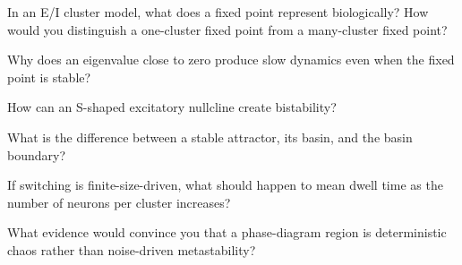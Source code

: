 \begin{conceptquestions}
  \item In an E/I cluster model, what does a fixed point represent biologically? How would you distinguish a one-cluster fixed point from a many-cluster fixed point?
  \item Why does an eigenvalue close to zero produce slow dynamics even when the fixed point is stable?
  \item How can an S-shaped excitatory nullcline create bistability?
  \item What is the difference between a stable attractor, its basin, and the basin boundary?
  \item If switching is finite-size-driven, what should happen to mean dwell time as the number of neurons per cluster increases?
  \item What evidence would convince you that a phase-diagram region is deterministic chaos rather than noise-driven metastability?
\end{conceptquestions}

\clearpage
